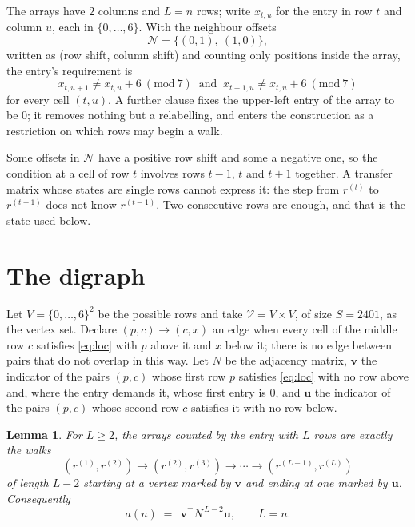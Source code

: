 \documentclass[11pt,a4paper]{article}
\theoremstyle{plain}
\newtheorem{lemma}[theorem]{Lemma}
\theoremstyle{definition}
\begin{document}
The arrays have $2$ columns and $L=n$ rows; write $x_{t,u}$ for the entry in
row $t$ and column $u$, each in $\{0,\dots,6\}$. With the neighbour offsets
\[
\mathcal N=\{(0,1),\ (1,0)\},
\]
written as (row shift, column shift) and counting only positions inside the array, the
entry's requirement is
\begin{equation}\label{eq:loc}
x_{t,u+1}\ne x_{t,u}+6\ (\mathrm{mod}\ 7)\ \text{ and }\ x_{t+1,u}\ne x_{t,u}+6\ (\mathrm{mod}\ 7)
\end{equation}
for every cell $(t,u)$. A further clause fixes the upper-left entry of the array to be $0$; it removes nothing but a relabelling, and enters the construction as a restriction on which rows may begin a walk.

Some offsets in $\mathcal N$ have a positive row shift and some a negative one, so the
condition at a cell of row $t$ involves rows $t-1$, $t$ and $t+1$ together. A transfer
matrix whose states are single rows cannot express it: the step from $r^{(t)}$ to
$r^{(t+1)}$ does not know $r^{(t-1)}$. Two consecutive rows are enough, and that is
the state used below.

\section{The digraph}

Let $V=\{0,\dots,6\}^{2}$ be the possible rows and take
$\mathcal V=V\times V$, of size $S=2401$, as the vertex set. Declare $(p,c)\to(c,x)$ an edge
when every cell of the middle row $c$ satisfies \eqref{eq:loc} with $p$ above it and $x$
below it; there is no edge between pairs that do not overlap in this way. Let $N$ be the
adjacency matrix, $\mathbf{v}$ the indicator of the pairs $(p,c)$ whose first row $p$
satisfies \eqref{eq:loc} with no row above and, where the entry demands it, whose first entry is $0$, and $\mathbf{u}$ the indicator of
the pairs $(p,c)$ whose second row $c$ satisfies it with no row below.

\begin{lemma}\label{lem:walk}
For $L\ge2$, the arrays counted by the entry with $L$ rows are exactly the walks
\[
(r^{(1)},r^{(2)})\to(r^{(2)},r^{(3)})\to\cdots\to(r^{(L-1)},r^{(L)})
\]
of length $L-2$ starting at a vertex marked by $\mathbf{v}$ and ending at one marked by
$\mathbf{u}$. Consequently
\[
a(n)\;=\;\,\mathbf{v}^{\!\top}N^{\,L-2}\mathbf{u},\qquad L=n .
\]
\end{lemma}
\end{document}
